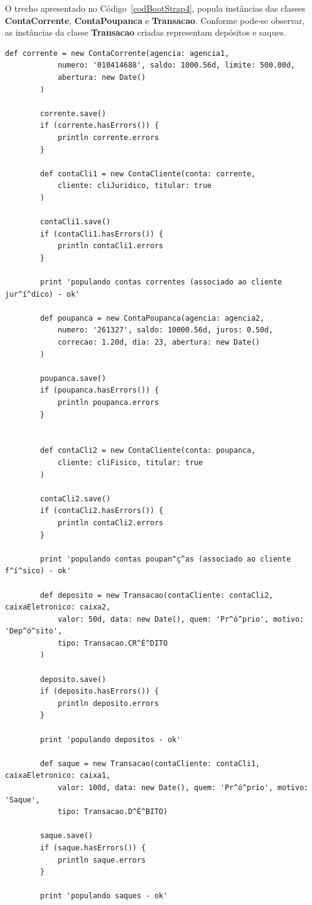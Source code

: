\newpage

O  trecho  apresentado  no  Código~\ref{codBootStrap4},  popula  instâncias  das
classes  {\bf ContaCorrente},  {\bf ContaPoupanca}  e {\bf  Transacao}. Conforme
pode-se observar,  as instâncias da  classe {\bf Transacao}  criadas representam
depósitos e saques.
  
\begin{lstlisting}[caption={\bf BootStrap.groovy (4)}, frame = trBL, float=htbp,
    label=codBootStrap4] 
        def corrente = new ContaCorrente(agencia: agencia1, 
            numero: '010414688', saldo: 1000.56d, limite: 500.00d,
            abertura: new Date()
        )
    
        corrente.save()
        if (corrente.hasErrors()) {
            println corrente.errors
        }

        def contaCli1 = new ContaCliente(conta: corrente, 
            cliente: cliJuridico, titular: true
        )
    
        contaCli1.save()
        if (contaCli1.hasErrors()) {
            println contaCli1.errors
        }
        
        print 'populando contas correntes (associado ao cliente jur^í^dico) - ok'
                
        def poupanca = new ContaPoupanca(agencia: agencia2, 
            numero: '261327', saldo: 10000.56d, juros: 0.50d,
            correcao: 1.20d, dia: 23, abertura: new Date()
        )
    
        poupanca.save()
        if (poupanca.hasErrors()) {
            println poupanca.errors
        }


        def contaCli2 = new ContaCliente(conta: poupanca, 
            cliente: cliFisico, titular: true
        )
    
        contaCli2.save()
        if (contaCli2.hasErrors()) {
            println contaCli2.errors
        }
        
        print 'populando contas poupan^ç^as (associado ao cliente f^í^sico) - ok'
        
        def deposito = new Transacao(contaCliente: contaCli2, caixaEletronico: caixa2, 
            valor: 50d, data: new Date(), quem: 'Pr^ó^prio', motivo: 'Dep^ó^sito',
            tipo: Transacao.CR^É^DITO
        )
        
        deposito.save()
        if (deposito.hasErrors()) {
            println deposito.errors
        }
        
        print 'populando depositos - ok'
        
        def saque = new Transacao(contaCliente: contaCli1, caixaEletronico: caixa1, 
            valor: 100d, data: new Date(), quem: 'Pr^ó^prio', motivo: 'Saque', 
            tipo: Transacao.D^É^BITO)
        
        saque.save()
        if (saque.hasErrors()) {
            println saque.errors
        }
        
        print 'populando saques - ok'
\end{lstlisting}

